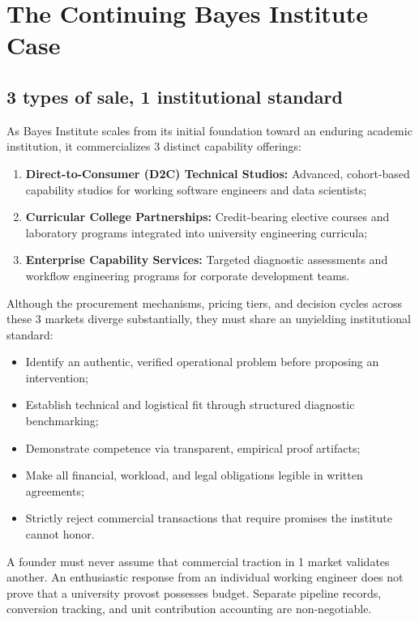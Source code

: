 \section{The Continuing Bayes Institute Case}

\subsection{3 types of sale, 1 institutional standard}

As Bayes Institute scales from its initial foundation toward an enduring academic institution, it commercializes 3 distinct capability offerings:
\begin{enumerate}
\item \textbf{Direct-to-Consumer (D2C) Technical Studios:} Advanced, cohort-based capability studios for working software engineers and data scientists;
\item \textbf{Curricular College Partnerships:} Credit-bearing elective courses and laboratory programs integrated into university engineering curricula;
\item \textbf{Enterprise Capability Services:} Targeted diagnostic assessments and workflow engineering programs for corporate development teams.
\end{enumerate}
Although the procurement mechanisms, pricing tiers, and decision cycles across these 3 markets diverge substantially, they must share an unyielding institutional standard:
\begin{itemize}
\item Identify an authentic, verified operational problem before proposing an intervention;
\item Establish technical and logistical fit through structured diagnostic benchmarking;
\item Demonstrate competence via transparent, empirical proof artifacts;
\item Make all financial, workload, and legal obligations legible in written agreements;
\item Strictly reject commercial transactions that require promises the institute cannot honor.
\end{itemize}
A founder must never assume that commercial traction in 1 market validates another. An enthusiastic response from an individual working engineer does not prove that a university provost possesses budget. Separate pipeline records, conversion tracking, and unit contribution accounting are non-negotiable.

